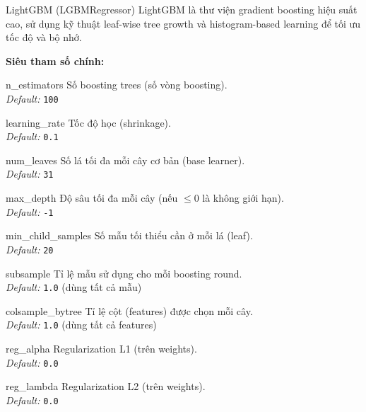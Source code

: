 \documentclass[12pt,a4paper]{article}
\newenvironment{methodlist}{
    \begin{description}[style=nextline, font=\ttfamily\color{sklearn-blue}]
}{
    \end{description}
}
\begin{document}
\begin{modelbox}{LightGBM (LGBMRegressor)}
LightGBM là thư viện gradient boosting hiệu suất cao, sử dụng kỹ thuật leaf-wise tree growth và histogram-based learning để tối ưu tốc độ và bộ nhớ.

\vspace{0.2cm}
\textbf{Siêu tham số chính:}
\begin{methodlist}
    \item[n\_estimators] 
    Số boosting trees (số vòng boosting). \\ 
    \textit{Default:} \texttt{100}
    
    \item[learning\_rate] 
    Tốc độ học (shrinkage). \\ 
    \textit{Default:} \texttt{0.1}
    
    \item[num\_leaves] 
    Số lá tối đa mỗi cây cơ bản (base learner). \\ 
    \textit{Default:} \texttt{31}
    
    \item[max\_depth] 
    Độ sâu tối đa mỗi cây (nếu $\le 0$ là không giới hạn). \\ 
    \textit{Default:} \texttt{-1}
    
    \item[min\_child\_samples] 
    Số mẫu tối thiểu cần ở mỗi lá (leaf). \\ 
    \textit{Default:} \texttt{20}
    
    \item[subsample] 
    Tỉ lệ mẫu sử dụng cho mỗi boosting round. \\ 
    \textit{Default:} \texttt{1.0} (dùng tất cả mẫu)
    
    \item[colsample\_bytree] 
    Tỉ lệ cột (features) được chọn mỗi cây. \\ 
    \textit{Default:} \texttt{1.0} (dùng tất cả features)
    
    \item[reg\_alpha] 
    Regularization L1 (trên weights). \\ 
    \textit{Default:} \texttt{0.0}
    
    \item[reg\_lambda] 
    Regularization L2 (trên weights). \\ 
    \textit{Default:} \texttt{0.0}
\end{methodlist}
\end{modelbox}
\end{document}

